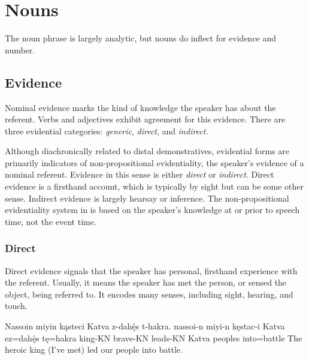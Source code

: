 \setchapterpreamble[u]{\margintoc}
\chapter{Nouns}
The \langname{} noun phrase is largely analytic, but nouns do inflect for evidence and number.

\section{Evidence} \label{sec:evidence}
Nominal evidence marks the kind of knowledge the speaker has about the referent. Verbs and adjectives exhibit agreement for this evidence. There are three evidential categories: \emph{generic}, \emph{direct}, and \emph{indirect}.

Although diachronically related to distal demonstratives, evidential forms are primarily indicators of non-propositional evidentiality,  the speaker's evidence of a nominal referent. Evidence in this sense is either \emph{direct} or \emph{indirect}. Direct evidence is a firsthand account, which is typically by sight but can be some other sense. Indirect evidence is largely hearsay or inference. The non-propositional evidentiality system in \langname{} is based on the speaker's knowledge at or prior to speech time, not the event time.

\subsection{Direct}
Direct evidence signals that the speaker has personal, firsthand experience with the referent. Usually, it means the speaker has met the person, or sensed the object, being referred to. It encodes many senses, including sight, hearing, and touch.

\begin{example}
    \script Nassoin miyin kąsteci Katva z-dahę́s t-hakra.
    \bits nassoi-n miyi-n kęstac-i {Katva ez=dahę́s} tę=hakra
    \gloss king-KN brave-KN leads-KN {Katva peoples} into=battle
    \tr The heroic king (I've met) led our people into battle.
\end{example}

